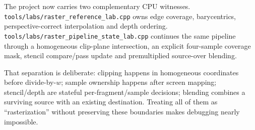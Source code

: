 The project now carries two complementary CPU witnesses. \texttt{tools/labs/raster\_reference\_lab.cpp} owns edge coverage, barycentrics, perspective-correct interpolation and depth ordering. \texttt{tools/labs/raster\_pipeline\_state\_lab.cpp} continues the same pipeline through a homogeneous clip-plane intersection, an explicit four-sample coverage mask, stencil compare/pass update and premultiplied source-over blending.

That separation is deliberate: clipping happens in homogeneous coordinates before divide-by-\(w\); sample ownership happens after screen mapping; stencil/depth are stateful per-fragment/sample decisions; blending combines a surviving source with an existing destination. Treating all of them as ``rasterization'' without preserving these boundaries makes debugging nearly impossible.
